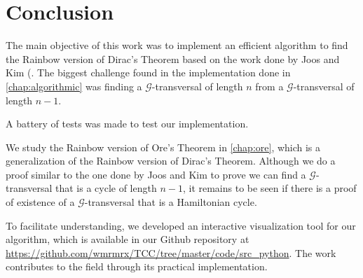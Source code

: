 
\chapter{Conclusion}

The main objective of this work was to implement an efficient algorithm to find
the Rainbow version of Dirac's Theorem based on the work done by Joos and Kim (\cite{Joos_2020}.
The biggest challenge found in the implementation done in \autoref{chap:algorithmic} was 
finding a $\mathcal{G}$-transversal of length $n$ from a $\mathcal{G}$-transversal of length $n - 1$.

A battery of tests was made to test our implementation.

We study the Rainbow version of Ore's Theorem in \autoref{chap:ore}, which is a generalization of
the Rainbow version of Dirac's Theorem. Although we do a proof similar
to the one done by Joos and Kim to prove we can find a 
$ \mathcal{G} $-transversal that is a cycle of length $ n - 1 $, it remains
to be seen if there is a proof of existence of a 
$ \mathcal{G} $-transversal that is a Hamiltonian cycle.

To facilitate understanding, we developed 
an interactive visualization tool for our algorithm, which is available in 
our Github repository at \url{https://github.com/wmrmrx/TCC/tree/master/code/src_python}.
The work contributes to the field through its practical implementation.
